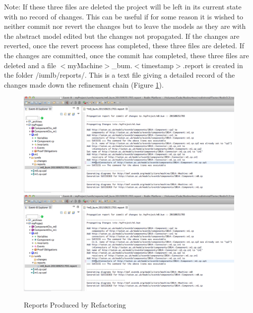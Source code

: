 Note: If these three files are deleted the project will be left in its current state with no record of changes. This can be useful if for some reason it is wished to neither commit nor revert the changes but to leave the models as they are with the abstract model edited but the changes not propagated. 
If the changes are reverted, once the revert process has completed, these three files are deleted.
If the changes are committed, once the commit has completed, these three files are deleted and a file $<$myMachine$>$\_bum.$<$timestamp$>$.report is created in the folder /iumlb/reports/. This is a text file giving a detailed record of the changes made down the refinement chain (Figure \ref{fig:ReportsProducedByRefactoring}).

 \begin{figure}[!htbp]
  \centering
  \ifplastex
  \includegraphics[width=1024]{figures/image67.png}
  \else
  \includegraphics[width=1\textwidth]{figures/image67.png}
  \fi
  \caption{Reports Produced by Refactoring}
  \label{fig:ReportsProducedByRefactoring}
\end{figure} 

